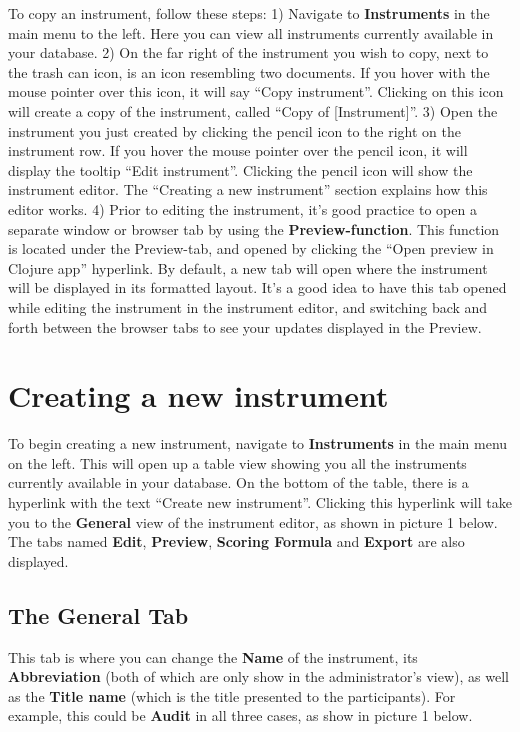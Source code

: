 \documentclass[]{book}
\begin{document}
To copy an instrument, follow these steps:
1) Navigate to \textbf{Instruments} in the main menu to the left. Here you can view all instruments currently available in your database.
2) On the far right of the instrument you wish to copy, next to the trash can icon, is an icon resembling two documents. If you hover with the mouse pointer over this icon, it will say ``Copy instrument''. Clicking on this icon will create a copy of the instrument, called ``Copy of {[}Instrument{]}''.
3) Open the instrument you just created by clicking the pencil icon to the right on the instrument row. If you hover the mouse pointer over the pencil icon, it will display the tooltip ``Edit instrument''. Clicking the pencil icon will show the instrument editor. The ``Creating a new instrument'' section explains how this editor works.
4) Prior to editing the instrument, it's good practice to open a separate window or browser tab by using the \textbf{Preview-function}. This function is located under the Preview-tab, and opened by clicking the ``Open preview in Clojure app'' hyperlink. By default, a new tab will open where the instrument will be displayed in its formatted layout. It's a good idea to have this tab opened while editing the instrument in the instrument editor, and switching back and forth between the browser tabs to see your updates displayed in the Preview.

\hypertarget{creating-a-new-instrument}{%
\section{Creating a new instrument}\label{creating-a-new-instrument}}

To begin creating a new instrument, navigate to \textbf{Instruments} in the main menu on the left. This will open up a table view showing you all the instruments currently available in your database. On the bottom of the table, there is a hyperlink with the text ``Create new instrument''. Clicking this hyperlink will take you to the \textbf{General} view of the instrument editor, as shown in picture 1 below. The tabs named \textbf{Edit}, \textbf{Preview}, \textbf{Scoring Formula} and \textbf{Export} are also displayed.

\hypertarget{the-general-tab}{%
\subsection{The General Tab}\label{the-general-tab}}

This tab is where you can change the \textbf{Name} of the instrument, its \textbf{Abbreviation} (both of which are only show in the administrator's view), as well as the \textbf{Title name} (which is the title presented to the participants).
For example, this could be \textbf{Audit} in all three cases, as show in picture 1 below.
\end{document}
